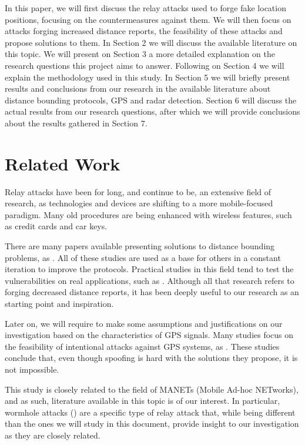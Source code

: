 \documentclass{article}
\begin{document}
In this paper, we will first discuss the relay attacks used to forge fake location positions, focusing on the countermeasures against them. We will then focus on attacks forging increased distance reports, the feasibility of these attacks and propose solutions to them. In Section 2 we will discuss the available literature on this topic. We will present on Section 3 a more detailed explanation on the research questions this project aims to answer. Following on Section 4 we will explain the methodology used in this study. In Section 5 we will briefly present results and conclusions from our research in the available literature about distance bounding protocols, GPS and radar detection. Section 6 will discuss the actual results from our research questions, after which we will provide conclusions about the results gathered in Section 7.

\section{Related Work}

Relay attacks have been for long, and continue to be, an extensive field of research, as technologies and devices are shifting to a more mobile-focused paradigm. Many old procedures are being enhanced with wireless features, such as credit cards and car keys.

There are many papers available presenting solutions to distance bounding problems, as \cite{brands1994distance, tu2007rfid, rasmussen2010realization}. All of these studies are used as a base for others in a constant iteration to improve the protocols. Practical studies in this field tend to test the vulnerabilities on real applications, such as \cite{francillon2011relay, francis2010practical, hancke2005practical, markantonakis2012practical, vandenbreekel2014relay}. Although all that research refers to forging decreased distance reports, it has been deeply useful to our research as an starting point and inspiration.

Later on, we will require to make some assumptions and justifications on our investigation based on the characteristics of GPS signals. Many studies focus on the feasibility of intentional attacks against GPS systems, as \cite{warner2003gps, wen2005countermeasures, jafarnia2012gps}. These studies conclude that, even though spoofing is hard with the solutions they propose, it is not impossible.

This study is closely related to the field of MANETs (Mobile Ad-hoc NETworks), and as such, literature available in this topic is of our interest. In particular, wormhole attacks (\cite{hu2006wormhole, maheshwari2007detecting, goyal2010literature}) are a specific type of relay attack that, while being different than the ones we will study in this document, provide insight to our investigation as they are closely related.
\end{document}
